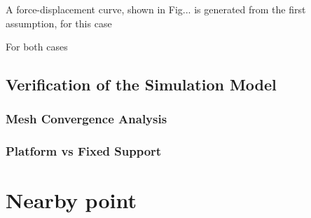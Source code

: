 A force-displacement curve, shown in Fig... is generated from the first assumption, 
for this case 

For both cases 

\subsection{Verification of the Simulation Model}

\subsubsection*{Mesh Convergence Analysis}
\subsubsection*{Platform vs Fixed Support}


\section{Nearby point}


